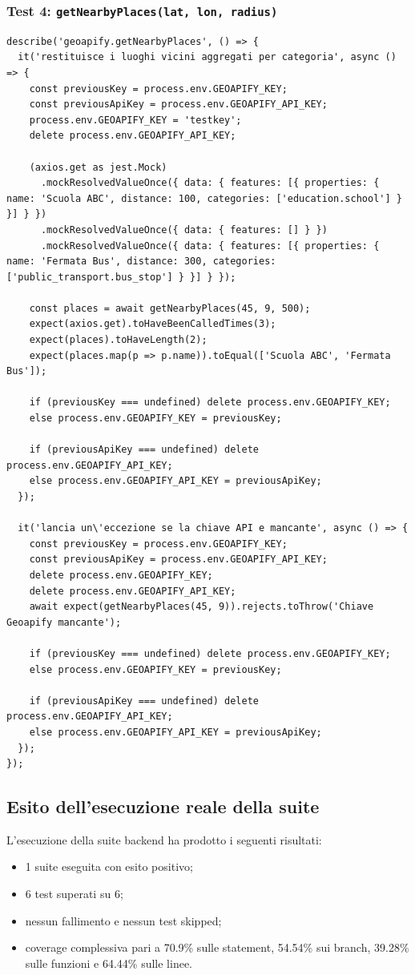 \documentclass[a4paper,11pt]{article}
\begin{document}
\subsubsection{Test 4: \texttt{getNearbyPlaces(lat, lon, radius)}}
\begin{lstlisting}[style=projectcode]
describe('geoapify.getNearbyPlaces', () => {
  it('restituisce i luoghi vicini aggregati per categoria', async () => {
    const previousKey = process.env.GEOAPIFY_KEY;
    const previousApiKey = process.env.GEOAPIFY_API_KEY;
    process.env.GEOAPIFY_KEY = 'testkey';
    delete process.env.GEOAPIFY_API_KEY;

    (axios.get as jest.Mock)
      .mockResolvedValueOnce({ data: { features: [{ properties: { name: 'Scuola ABC', distance: 100, categories: ['education.school'] } }] } })
      .mockResolvedValueOnce({ data: { features: [] } })
      .mockResolvedValueOnce({ data: { features: [{ properties: { name: 'Fermata Bus', distance: 300, categories: ['public_transport.bus_stop'] } }] } });

    const places = await getNearbyPlaces(45, 9, 500);
    expect(axios.get).toHaveBeenCalledTimes(3);
    expect(places).toHaveLength(2);
    expect(places.map(p => p.name)).toEqual(['Scuola ABC', 'Fermata Bus']);

    if (previousKey === undefined) delete process.env.GEOAPIFY_KEY;
    else process.env.GEOAPIFY_KEY = previousKey;

    if (previousApiKey === undefined) delete process.env.GEOAPIFY_API_KEY;
    else process.env.GEOAPIFY_API_KEY = previousApiKey;
  });

  it('lancia un\'eccezione se la chiave API e mancante', async () => {
    const previousKey = process.env.GEOAPIFY_KEY;
    const previousApiKey = process.env.GEOAPIFY_API_KEY;
    delete process.env.GEOAPIFY_KEY;
    delete process.env.GEOAPIFY_API_KEY;
    await expect(getNearbyPlaces(45, 9)).rejects.toThrow('Chiave Geoapify mancante');

    if (previousKey === undefined) delete process.env.GEOAPIFY_KEY;
    else process.env.GEOAPIFY_KEY = previousKey;

    if (previousApiKey === undefined) delete process.env.GEOAPIFY_API_KEY;
    else process.env.GEOAPIFY_API_KEY = previousApiKey;
  });
});
\end{lstlisting}

\subsection{Esito dell'esecuzione reale della suite}
L'esecuzione della suite backend ha prodotto i seguenti risultati:
\begin{itemize}
  \item 1 suite eseguita con esito positivo;
  \item 6 test superati su 6;
  \item nessun fallimento e nessun test skipped;
  \item coverage complessiva pari a 70.9\% sulle statement, 54.54\% sui branch, 39.28\% sulle funzioni e 64.44\% sulle linee.
\end{itemize}
\end{document}
